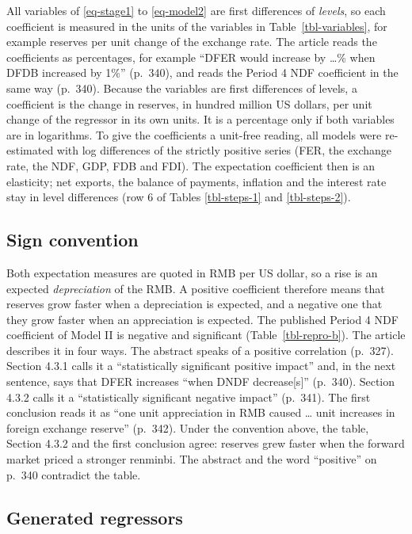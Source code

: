 \documentclass[
  12pt,
  a4paper,
]{article}
\begin{document}
All variables of \ref{eq-stage1} to \ref{eq-model2} are first
differences of \emph{levels}, so each coefficient is measured in the
units of the variables in Table~\ref{tbl-variables}, for example
reserves per unit change of the exchange rate. The article reads the
coefficients as percentages, for example ``DFER would increase by
\ldots\% when DFDB increased by 1\%'' (p.~340), and reads the Period 4
NDF coefficient in the same way (p.~340). Because the variables are
first differences of levels, a coefficient is the change in reserves, in
hundred million US dollars, per unit change of the regressor in its own
units. It is a percentage only if both variables are in logarithms. To
give the coefficients a unit-free reading, all models were re-estimated
with log differences of the strictly positive series (FER, the exchange
rate, the NDF, GDP, FDB and FDI). The expectation coefficient then is an
elasticity; net exports, the balance of payments, inflation and the
interest rate stay in level differences (row 6 of Tables
\ref{tbl-steps-1} and \ref{tbl-steps-2}).

\subsection{Sign convention}\label{sign-convention}

Both expectation measures are quoted in RMB per US dollar, so a rise is
an expected \emph{depreciation} of the RMB. A positive coefficient
therefore means that reserves grow faster when a depreciation is
expected, and a negative one that they grow faster when an appreciation
is expected. The published Period 4 NDF coefficient of Model II is
negative and significant (Table~\ref{tbl-repro-b}). The article
describes it in four ways. The abstract speaks of a positive correlation
(p.~327). Section 4.3.1 calls it a ``statistically significant positive
impact'' and, in the next sentence, says that DFER increases ``when DNDF
decrease{[}s{]}'' (p.~340). Section 4.3.2 calls it a ``statistically
significant negative impact'' (p.~341). The first conclusion reads it as
``one unit appreciation in RMB caused \ldots{} unit increases in foreign
exchange reserve'' (p.~342). Under the convention above, the table,
Section 4.3.2 and the first conclusion agree: reserves grew faster when
the forward market priced a stronger renminbi. The abstract and the word
``positive'' on p.~340 contradict the table.

\subsection{Generated regressors}\label{generated-regressors}
\end{document}
